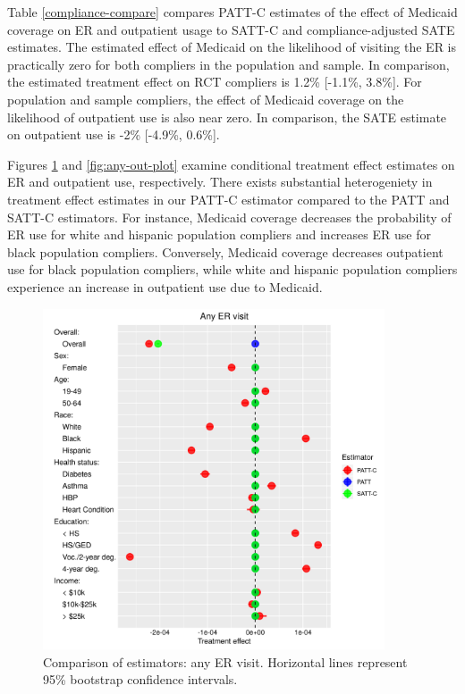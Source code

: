 \documentclass[hidelinks,12pt]{article}
\begin{document}
{{\color{red}Table \ref{compliance-compare} compares PATT-C estimates of the effect of Medicaid coverage on ER and outpatient usage to SATT-C and compliance-adjusted SATE estimates. The estimated effect of Medicaid on the likelihood of visiting the ER is practically zero for both compliers in the population and sample. In comparison, the estimated treatment effect on RCT compliers is 1.2\% [-1.1\%, 3.8\%]. For population and sample compliers, the effect of Medicaid coverage on the likelihood of outpatient use is also near zero. In comparison, the SATE estimate on outpatient use is -2\% [-4.9\%, 0.6\%].

Figures \ref{fig:any-visit-plot} and \ref{fig:any-out-plot} examine conditional treatment effect estimates on ER and outpatient use, respectively. There exists substantial heterogeniety in treatment effect estimates in our PATT-C estimator compared to the PATT and SATT-C estimators. For instance, Medicaid coverage decreases the probability of ER use for white and hispanic population compliers and increases ER use for black population compliers. Conversely, Medicaid coverage decreases outpatient use for black population compliers, while white and hispanic population compliers experience an increase in outpatient use due to Medicaid.}
%

\begin{figure}[htbp]
\begin{center}
\includegraphics[width = 0.9\textwidth]{any-visit-plot}
    \caption{Comparison of estimators: any ER visit. Horizontal lines represent 95\% bootstrap confidence intervals.\label{fig:any-visit-plot}}
\end{center}
\end{figure}
%

}
\end{document}

